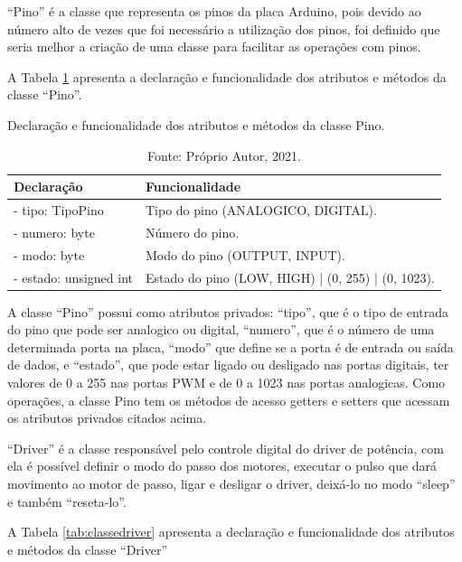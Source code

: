 “Pino” é a classe que representa os pinos da placa Arduino, pois devido ao número alto de vezes que foi 
necessário a utilização dos pinos, foi definido que seria melhor a criação de uma classe para facilitar 
as operações com pinos. 

A Tabela \ref{tab:classepino} apresenta a declaração e funcionalidade dos atributos e métodos da 
classe “Pino”.

\begin{table}[!htb]
    \centering
    \caption{Declaração e funcionalidade dos atributos e métodos da classe Pino.}
    \begin{tabular}{lp{9cm}}
        \hline
        \textbf{Declaração} & \textbf{Funcionalidade}\\
        \hline
        - tipo: TipoPino & Tipo do pino (ANALOGICO, DIGITAL).\\
        - numero: byte & Número do pino.\\
        - modo: byte & Modo do pino (OUTPUT, INPUT).\\
        - estado: unsigned int & Estado do pino (LOW, HIGH) | (0, 255) | (0, 1023).\\
        \hline       
    \end{tabular}
    \caption*{Fonte: Próprio Autor, 2021.}
    \label{tab:classepino}
\end{table}

A classe “Pino” possui como atributos privados: “tipo”, que é o tipo de entrada do pino que pode ser 
analogico ou digital, “numero”, que é o número de uma determinada porta na placa, “modo” que define se 
a porta é de entrada ou saída de dados, e “estado”, que pode estar ligado ou desligado nas portas digitais, 
ter valores de 0 a 255 nas portas PWM e de 0 a 1023 nas portas analogicas. Como operações, a classe Pino 
tem os métodos de acesso getters e setters que acessam os atributos privados citados acima.

“Driver” é a classe responsável pelo controle digital do driver de potência, com ela é possível definir 
o modo do passo dos motores, executar o pulso que dará movimento ao motor de passo, ligar e desligar 
o driver, deixá-lo no modo “sleep” e também “reseta-lo”.

A Tabela \ref{tab:classedriver} apresenta a declaração e funcionalidade dos atributos e métodos da 
classe “Driver”

